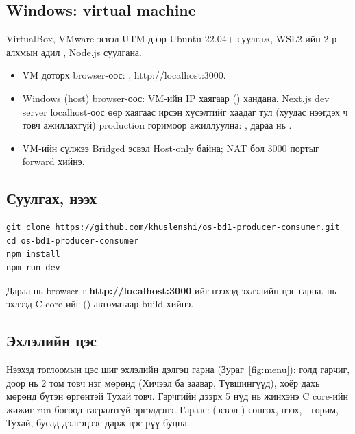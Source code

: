 \documentclass[12pt,a4paper]{article}
\newcommand{\key}[1]{\fbox{\footnotesize\ttfamily #1}}
\begin{document}
\subsection{Windows: virtual machine}
VirtualBox, VMware эсвэл UTM дээр Ubuntu 22.04+ суулгаж, WSL2-ийн 2-р алхмын адил , Node.js суулгана.
\begin{itemize}
  \item VM доторх browser-оос: , http://localhost:3000.
  \item Windows (host) browser-оос: VM-ийн IP хаягаар () хандана. Next.js dev server localhost-оос өөр хаягаас ирсэн хүсэлтийг хаадаг тул (хуудас нээгдэх ч товч ажиллахгүй) production горимоор ажиллуулна: , дараа нь .
  \item VM-ийн сүлжээ Bridged эсвэл Host-only байна; NAT бол 3000 портыг forward хийнэ.
\end{itemize}

\subsection{Суулгах, нээх}
\begin{lstlisting}[style=shell]
git clone https://github.com/khuslenshi/os-bd1-producer-consumer.git
cd os-bd1-producer-consumer
npm install
npm run dev
\end{lstlisting}
Дараа нь browser-т \textbf{http://localhost:3000}-ийг нээхэд эхлэлийн цэс гарна.  нь эхлээд C core-ийг () автоматаар build хийнэ.

\subsection{Эхлэлийн цэс}
Нээхэд тоглоомын цэс шиг эхлэлийн дэлгэц гарна (Зураг~\ref{fig:menu}): голд гарчиг, доор нь 2 том товч нэг мөрөнд (Хичээл ба заавар, Түвшингүүд), хоёр дахь мөрөнд бүтэн өргөнтэй Тухай товч. Гарчгийн дээрх 5 нүд нь жинхэнэ C core-ийн жижиг run бөгөөд тасралтгүй эргэлдэнэ. Гараас: \key{←} \key{→} (эсвэл \key{↑} \key{↓}) сонгох, \key{Enter} нээх, \key{1}-\key{2} горим, \key{3} Тухай, бусад дэлгэцээс \key{Esc} дарж цэс рүү буцна.
\end{document}
